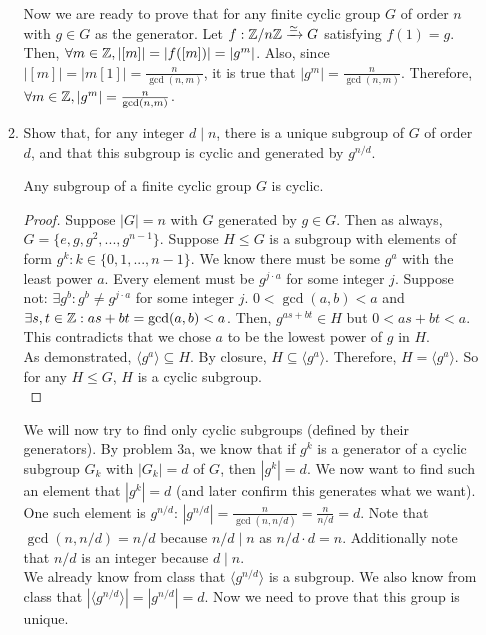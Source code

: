 \documentclass{amsart}
\begin{document}
\begin{enumerate}[itemsep=0.4in]
\begin{enumerate}
        Now we are ready to prove that for any finite cyclic group $G$ of order $n$ with $g\in G$ as the generator. Let $f:\mathbb{Z}/n\mathbb{Z}\xrightarrow{\simeq}G$ satisfying $f(1)=g$. Then, $\forall m\in\mathbb{Z},|[m]|=|f([m])|=|g^m|$. Also, since $|[m]|=|m[1]|=\frac n{\gcd(n,m)}$, it is true that $|g^m|=\frac n{\gcd(n,m)}$. Therefore, $\forall m\in\mathbb{Z},|g^m|=\frac n{\gcd(n,m)}$.


	\item Show that, for any integer $d\mid n$, there is a unique subgroup of $G$ of order $d$, and that this subgroup is cyclic and generated by $g^{n/d}$.

        \begin{lemma}
            Any subgroup of a finite cyclic group $G$ is cyclic. 
        \end{lemma}

        \begin{proof}
            Suppose $|G|=n$ with $G$ generated by $g\in G$. Then as always, $G=\{e,g,g^2,...,g^{n-1}\}$. Suppose $H\leq G$ is a subgroup with elements of form $g^k:k\in\{0,1,...,n-1\}$. We know there must be some $g^a$ with the least power $a$. Every element must be $g^{j\cdot a}$ for some integer $j$. Suppose not: $\exists g^b:g^b\neq g^{j\cdot a}$ for some integer $j$. $0<\gcd(a,b)<a$ and $\exists s,t\in\mathbb{Z}:as+bt=\gcd(a,b)<a$. Then, $g^{as+bt}\in H$ but $0<as+bt<a$. This contradicts that we chose $a$ to be the lowest power of $g$ in $H$.\\

            As demonstrated, $\langle g^a\rangle\subseteq H$. By closure, $H\subseteq\langle g^a\rangle$. Therefore, $H=\langle g^a\rangle$. So for any $H\leq G$, $H$ is a cyclic subgroup.\\
        \end{proof}

        We will now try to find only cyclic subgroups (defined by their generators). By problem 3a, we know that if $g^k$ is a generator of a cyclic subgroup $G_k$ with $|G_k|=d$ of $G$, then $|g^k|=d$. We now want to find such an element that $|g^k|=d$ (and later confirm this generates what we want). One such element is $g^{n/d}$: $|g^{n/d}|=\frac n{\gcd(n,n/d)}=\frac n{n/d}=d$. Note that $\gcd(n,n/d)=n/d$ because $n/d\mid n$ as $n/d\cdot d=n$. Additionally note that $n/d$ is an integer because $d\mid n$.\\

        We already know from class that $\langle g^{n/d}\rangle$ is a subgroup. We also know from class that $|\langle g^{n/d}\rangle|=|g^{n/d}|=d$. Now we need to prove that this group is unique.\\


\end{enumerate}
\end{enumerate}
\end{document}
